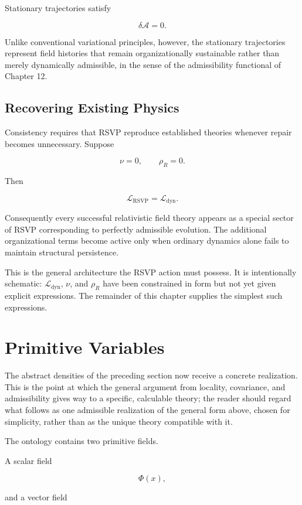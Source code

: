 \documentclass[11pt,oneside]{book}
\numberwithin{equation}{chapter}
\theoremstyle{definition}
\theoremstyle{plain}
\begin{document}
Stationary trajectories satisfy

\[
\delta\mathcal A=0.
\]

Unlike conventional variational principles, however, the stationary
trajectories represent field histories that remain organizationally
sustainable rather than merely dynamically admissible, in the sense of the
admissibility functional of Chapter 12.

\subsection*{Recovering Existing Physics}

Consistency requires that RSVP reproduce established theories whenever
repair becomes unnecessary. Suppose

\[
\nu=0,
\qquad
\rho_R=0.
\]

Then

\[
\mathcal L_{\mathrm{RSVP}}
=
\mathcal L_{\mathrm{dyn}}.
\]

Consequently every successful relativistic field theory appears as a special
sector of RSVP corresponding to perfectly admissible evolution. The
additional organizational terms become active only when ordinary dynamics
alone fails to maintain structural persistence.

This is the general architecture the RSVP action must possess. It is
intentionally schematic: \(\mathcal L_{\mathrm{dyn}}\), \(\nu\), and
\(\rho_R\) have been constrained in form but not yet given explicit
expressions. The remainder of this chapter supplies the simplest such
expressions.

\section{Primitive Variables}

The abstract densities of the preceding section now receive a concrete
realization. This is the point at which the general argument from locality,
covariance, and admissibility gives way to a specific, calculable theory;
the reader should regard what follows as one admissible realization of the
general form above, chosen for simplicity, rather than as the unique
theory compatible with it.

The ontology contains two primitive fields.

A scalar field

\[
\Phi(x),
\]

and a vector field
\end{document}
